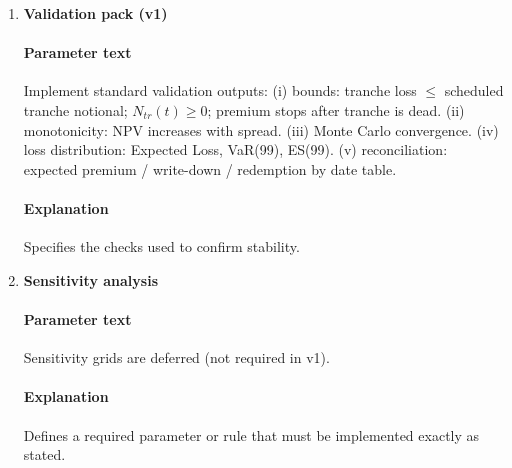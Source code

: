\documentclass[11pt]{article}
\begin{document}
\begin{enumerate}[label=\arabic*),leftmargin=*,align=left]
\paragraph{Explanation} Direct algebraic resolution.
\paragraph{Formulas}
\begin{align*}
NPV(s) &= s \times PV01 - PV_{wd} + PV_{red} \\
s^* &= \frac{PV_{wd} - PV_{red}}{PV01}
\end{align*}

\item \textbf{Validation pack (v1)}
\paragraph{Parameter text} Implement standard validation outputs: (i) bounds: tranche loss $\le$ scheduled tranche notional; $N_{tr}(t) \ge 0$; premium stops after tranche is dead. (ii) monotonicity: NPV increases with spread. (iii) Monte Carlo convergence. (iv) loss distribution: Expected Loss, VaR(99), ES(99). (v) reconciliation: expected premium / write-down / redemption by date table.
\paragraph{Explanation} Specifies the checks used to confirm stability.

\item \textbf{Sensitivity analysis}
\paragraph{Parameter text} Sensitivity grids are deferred (not required in v1).
\paragraph{Explanation} Defines a required parameter or rule that must be implemented exactly as stated.

\end{enumerate}
\end{document}
